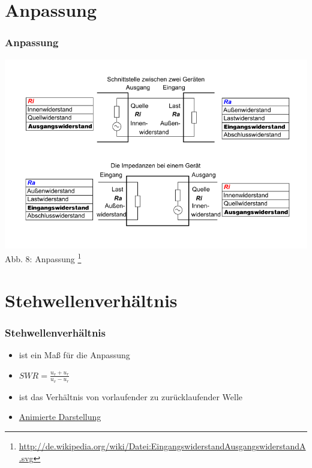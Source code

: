 \section*{Anpassung}
\begin{frame}
\frametitle{Anpassung}
\includegraphics[scale=0.35]{e10/Anpassung.png}\\
Abb. 8: Anpassung
\footnote{\url{http://de.wikipedia.org/wiki/Datei:EingangswiderstandAusgangswiderstandA.svg}}
\end{frame}

\section*{Stehwellenverh\"altnis}
\begin{frame}
\frametitle{Stehwellenverh\"altnis}
\begin{Large}
\begin{itemize}
	\item ist ein Maß für die Anpassung
	\item \Huge $SWR = \frac{u_{v}+u_{r}}{u_{v}-u_{r}}$ \Large
	\item ist das Verhältnis von vorlaufender zu zurücklaufender Welle
	\item \href{http://commons.wikimedia.org/wiki/File:Stehwelle_(Animation).gif}{Animierte Darstellung}
\end{itemize}
\end{Large}
\end{frame}

